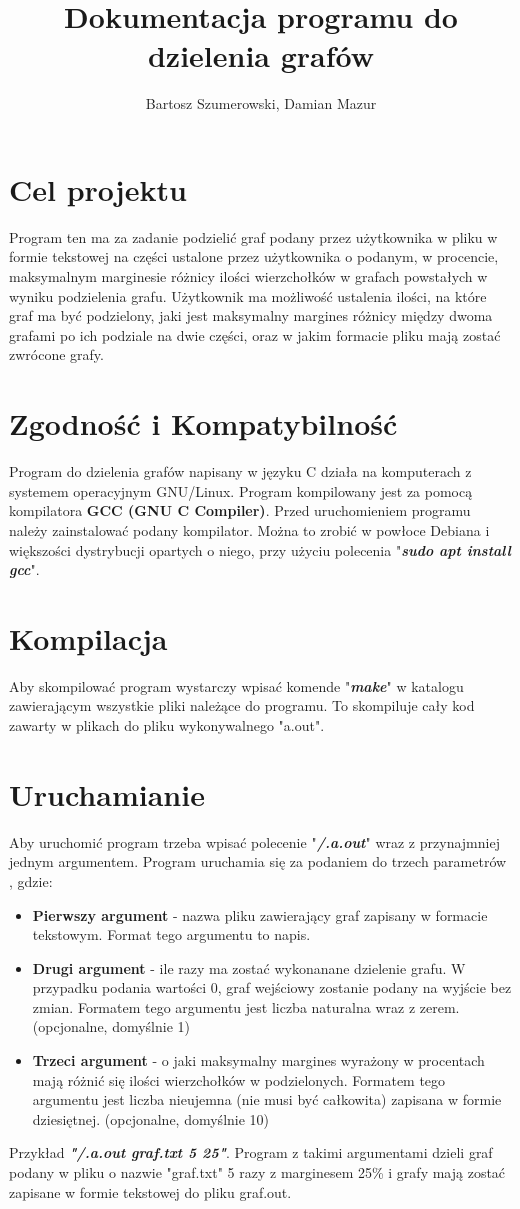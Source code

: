 \documentclass{article}
\date{}
\title{Dokumentacja programu do dzielenia grafów}
\author{Bartosz Szumerowski, Damian Mazur}
\begin{document}
\maketitle
\section{Cel projektu}
    Program ten ma za zadanie podzielić graf podany przez użytkownika w pliku w formie tekstowej na części ustalone przez użytkownika o podanym, w procencie, maksymalnym marginesie różnicy ilości wierzchołków w grafach powstałych w wyniku podzielenia grafu. Użytkownik ma możliwość ustalenia ilości, na które graf ma być podzielony, jaki jest maksymalny margines różnicy między dwoma grafami po ich podziale na dwie części, oraz w jakim formacie pliku mają zostać zwrócone grafy. 
\section{Zgodność i Kompatybilność}
    Program do dzielenia grafów napisany w języku C działa na komputerach z systemem operacyjnym GNU/Linux. Program kompilowany jest za pomocą kompilatora \textbf{GCC (GNU C Compiler)}. Przed uruchomieniem programu należy zainstalować podany kompilator. Można to zrobić w powłoce Debiana i większości dystrybucji opartych o niego, przy użyciu polecenia "\textit{\textbf{sudo apt install gcc}}".
\section{Kompilacja}
    Aby skompilować program wystarczy wpisać komende "\textit{\textbf{make}}" w katalogu zawierającym wszystkie pliki należące do programu. To skompiluje cały kod zawarty w plikach do pliku wykonywalnego "a.out".
\section{Uruchamianie}
    Aby uruchomić program trzeba wpisać polecenie "\textit{\textbf{/.a.out}}" wraz z przynajmniej jednym argumentem.
    Program uruchamia się za podaniem do trzech  parametrów , gdzie:
    \begin{itemize}
    \item \textbf{Pierwszy argument} - nazwa pliku zawierający graf zapisany w formacie tekstowym. Format tego argumentu to napis.
    \item \textbf{Drugi argument} -  ile razy ma zostać wykonanane dzielenie grafu. W przypadku podania wartości 0, graf wejściowy zostanie podany na wyjście bez zmian. Formatem tego argumentu jest liczba naturalna wraz z zerem. (opcjonalne, domyślnie 1)
    \item \textbf{Trzeci argument} -  o jaki maksymalny margines wyrażony w procentach mają różnić się ilości wierzchołków w podzielonych. Formatem tego argumentu jest liczba nieujemna (nie musi być całkowita) zapisana w formie dziesiętnej. (opcjonalne, domyślnie 10)
\end{itemize}
Przykład \textbf{\textit{"/.a.out graf.txt 5 25"}}. Program z takimi argumentami dzieli graf podany w pliku o nazwie "graf.txt" 5 razy z marginesem 25\%  i grafy mają zostać zapisane w formie tekstowej do pliku graf.out.
\end{document}
